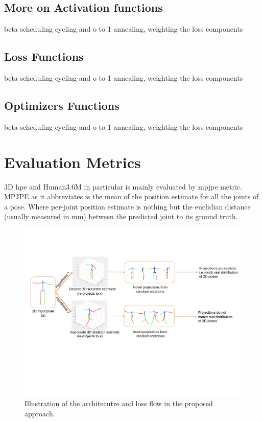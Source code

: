 \subsection{More on Activation functions}
beta scheduling cycling and o to 1 annealing, weighting the loss components

\subsection{Loss Functions}
beta scheduling cycling and o to 1 annealing, weighting the loss components

\subsection{Optimizers Functions}
beta scheduling cycling and o to 1 annealing, weighting the loss components



\section{Evaluation Metrics} %
3D \ac{hpe} and Human3.6M in particular is mainly evaluated by \ac{mpjpe} metric. MPJPE as it abbreviates is the mean of the position estimate for all the joints of a pose. Where per-joint position estimate is nothing but the euclidian distance (usually measured in mm) between the predicted joint to its ground truth.


\begin{figure}[h]
    \centering
    \includegraphics[width=\textwidth]{figures/h36_viz/novel_view_contraint.pdf}
    \caption{Illustration of the architecutre and loss flow in the proposed approach.}
    \label{fig:novel_view_constraint}
\end{figure}

